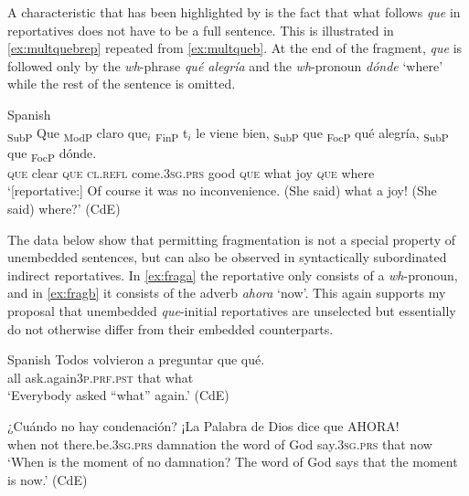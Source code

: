 A characteristic that has been highlighted by \citet{DemonteSoriano2014} is the fact that what follows \emph{que}  in reportatives does not have to be a full sentence.   This is illustrated in \eqref{ex:multquebrep}  repeated from \eqref{ex:multqueb}. At the end of the fragment, \emph{que} is followed only by the \textit{wh}-phrase \emph{qué alegría} and the \textit{wh}-pronoun \emph{dónde} `where' while the rest of the sentence is omitted. 


\ea
\label{ex:multquebrep}
Spanish\\ 
\gll {\ob}\textsubscript{SubP} Que{\cb}  {\ob}\textsubscript{ModP} claro que$_i${\cb} {\ob}\textsubscript{FinP} t$_i${\cb} le viene bien, {\ob}\textsubscript{SubP} que{\cb}  {\ob}\textsubscript{FocP} qué alegría{\cb}, {\ob}\textsubscript{SubP} que{\cb}  {\ob}\textsubscript{FocP} dónde.{\cb} \\
{} \textsc{que} {} clear \textsc{que} {} {} \textsc{cl.refl} come.\textsc{3sg.prs} good {} \textsc{que} {} what joy {} \textsc{que} {} where \\
\glt `[reportative:] Of course it was no inconvenience. (She said) what a joy! (She said) where?' (CdE)
\z



The data below show that permitting fragmentation is not a special property of unembedded sentences, but can also be observed in syntactically subordinated indirect reportatives. In \eqref{ex:fraga}  the reportative only consists of a \textit{wh}-pronoun, and in \eqref{ex:fragb}  it consists of the adverb \emph{ahora} `now'. This again supports my proposal that unembedded \emph{que}-initial reportatives are  unselected but essentially do not otherwise differ from their embedded counterparts. 

\ea Spanish
\ea \label{ex:fraga}
\gll  Todos {volvieron a preguntar} que qué.  \\
all ask.again\textsc{3p.prf.pst}  that what\\
\glt `Everybody asked ``what'' again.' (CdE)

\ex \label{ex:fragb}
\gll ¿Cuándo no hay condenación? ¡La Palabra de Dios dice que AHORA! \\
when not there.be.\textsc{3sg.prs} damnation the word of God say.\textsc{3sg.prs} that now\\
\glt `When is the moment of no damnation? The word of God says that the moment is now.' 	(CdE)
\z
\z





